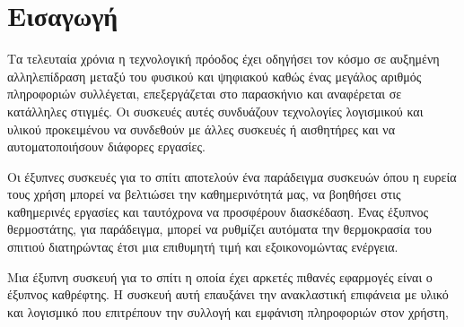 \chapter{Εισαγωγή}
\label{chapter:intro}

\setlength{\parskip}{1em}
Τα τελευταία χρόνια η τεχνολογική πρόοδος έχει οδηγήσει τον κόσμο σε αυξημένη αλληλεπίδραση μεταξύ του φυσικού και ψηφιακού καθώς ένας μεγάλος αριθμός πληροφοριών συλλέγεται, επεξεργάζεται στο παρασκήνιο και αναφέρεται σε κατάλληλες στιγμές. Οι συσκευές αυτές συνδυάζουν τεχνολογίες λογισμικού και υλικού προκειμένου να συνδεθούν με άλλες συσκευές ή αισθητήρες και να αυτοματοποιήσουν διάφορες εργασίες.

Οι έξυπνες συσκευές για το σπίτι αποτελούν ένα παράδειγμα συσκευών όπου η ευρεία τους χρήση μπορεί να βελτιώσει την καθημερινότητά μας, να βοηθήσει στις καθημερινές εργασίες και ταυτόχρονα να προσφέρουν διασκέδαση. Ένας έξυπνος θερμοστάτης, για παράδειγμα, μπορεί να ρυθμίζει αυτόματα την θερμοκρασία του σπιτιού διατηρώντας έτσι μια επιθυμητή τιμή και εξοικονομώντας ενέργεια.

Μια έξυπνη συσκευή για το σπίτι η οποία έχει αρκετές πιθανές εφαρμογές είναι ο έξυπνος καθρέφτης. Η συσκευή αυτή επαυξάνει την ανακλαστική επιφάνεια με υλικό και λογισμικό που επιτρέπουν την συλλογή και εμφάνιση πληροφοριών στον χρήστη, 






